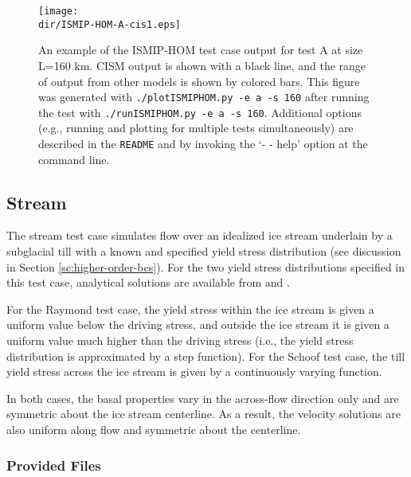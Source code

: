 \begin{figure}[H!]
	\centering
	\texttt{[image: \\dir/ISMIP-HOM-A-cis1.eps]}
	\caption{An example of the ISMIP-HOM test case output for test A at size L=160 km. 
CISM output is shown with a black line, and the range of output from other models is shown by colored bars. 
This figure was generated with \texttt{./plotISMIPHOM.py -e a -s 160} after running the test with \texttt{./runISMIPHOM.py -e a -s 160}.
Additional options (e.g., running and plotting for multiple tests simultaneously) are described in the \texttt{README} and by invoking the
`- - help' option at the command line.}
	\label{fig:ismiphom-results}
\end{figure}
\FloatBarrier

\subsection{Stream}

The stream test case simulates flow over an idealized ice stream underlain by a subglacial till with a known and specified
yield stress distribution (see discussion in Section \ref{sc:higher-order-bcs}). For the two yield stress distributions specified in this test case, 
analytical solutions are available from \citet{Raymond2000} and \citet{Schoof2006}. 

For the Raymond test case, the yield stress within the ice stream is given a uniform value below the driving stress, and outside the
ice stream it is given a uniform value much higher than the driving stress (i.e., the yield stress distribution is approximated by a
step function). For the Schoof test case, the till yield stress across the ice stream is given by a continuously varying function.

In both cases, the basal properties vary in the across-flow direction only and are symmetric about the ice stream centerline.
As a result, the velocity solutions are also uniform along flow and symmetric about the centerline.

\subsubsection{Provided Files}

